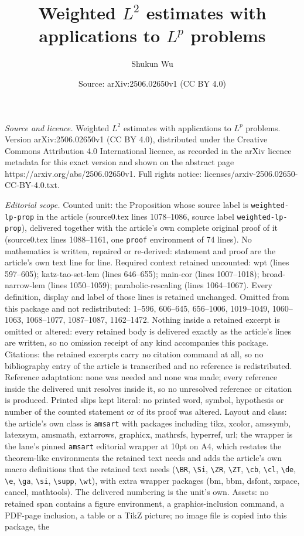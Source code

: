 \documentclass[10pt,a4paper]{amsart}
\title[Weighted $L^2$ estimates with applications to $L^p$ problems]{Weighted $L^2$ estimates with applications to $L^p$ problems}
\author{Shukun Wu}
\date{Source: arXiv:2506.02650v1 (CC BY 4.0)}
\begin{document}
\maketitle

\noindent\emph{Source and licence.} Weighted $L^2$ estimates with applications to $L^p$ problems. Version arXiv:2506.02650v1 (CC BY 4.0), distributed under the Creative Commons Attribution 4.0 International licence, as recorded in the arXiv licence metadata for this exact version and shown on the abstract page https://arxiv.org/abs/2506.02650v1. Full rights notice: licenses/arxiv-2506.02650-CC-BY-4.0.txt.\par\smallskip

\noindent\textit{Editorial scope.} Counted unit: the Proposition whose source label is \texttt{weighted-lp-prop} in the article (source0.tex lines 1078--1086, source label \texttt{weighted-lp-prop}), delivered together with the article's own complete original proof of it (source0.tex lines 1088--1161, one \texttt{proof} environment of 74 lines). No mathematics is written, repaired or re-derived: statement and proof are the article's own text line for line. Required context retained uncounted: wpt (lines 597--605); katz-tao-set-lem (lines 646--655); main-cor (lines 1007--1018); broad-narrow-lem (lines 1050--1059); parabolic-rescaling (lines 1064--1067). Every definition, display and label of those lines is retained unchanged. Omitted from this package and not redistributed: 1--596, 606--645, 656--1006, 1019--1049, 1060--1063, 1068--1077, 1087--1087, 1162--1472. Nothing inside a retained excerpt is omitted or altered: every retained body is delivered exactly as the article's lines are written, so no omission receipt of any kind accompanies this package. Citations: the retained excerpts carry no citation command at all, so no bibliography entry of the article is transcribed and no reference is redistributed. Reference adaptation: none was needed and none was made; every reference inside the delivered unit resolves inside it, so no unresolved reference or citation is produced. Printed slips kept literal: no printed word, symbol, hypothesis or number of the counted statement or of its proof was altered. Layout and class: the article's own class is \texttt{amsart} with packages including tikz, xcolor, amssymb, latexsym, amsmath, extarrows, graphicx, mathrsfs, hyperref, url; the wrapper is the lane's pinned \texttt{amsart} editorial wrapper at 10pt on A4, which restates the theorem-like environments the retained text needs and adds the article's own macro definitions that the retained text needs (\texttt{\textbackslash BR}, \texttt{\textbackslash Si}, \texttt{\textbackslash ZR}, \texttt{\textbackslash ZT}, \texttt{\textbackslash cb}, \texttt{\textbackslash cl}, \texttt{\textbackslash de}, \texttt{\textbackslash e}, \texttt{\textbackslash ga}, \texttt{\textbackslash si}, \texttt{\textbackslash supp}, \texttt{\textbackslash wt}), with extra wrapper packages (bm, bbm, dsfont, xspace, cancel, mathtools). The delivered numbering is the unit's own. Assets: no retained span contains a figure environment, a graphics-inclusion command, a PDF-page inclusion, a table or a TikZ picture; no image file is copied into this package, the 
\end{document}
